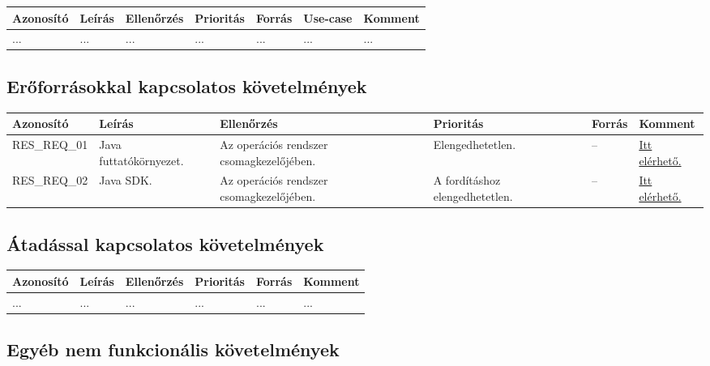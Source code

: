 \begin{longtable}{| l | l | l | l | l | l | l |}
\hline
\textbf{Azonosító}   & \textbf{Leírás} & \textbf{Ellenőrzés} & \textbf{Prioritás} & \textbf{Forrás} & \textbf{Use-case} & \textbf{Komment} \tabularnewline
\hline\hline
... & ... & ... & ... & ... & ... & ... \tabularnewline
\hline
\end{longtable}

\subsection{Erőforrásokkal kapcsolatos követelmények}


\begin{longtable}{| l | l | p{3cm} | p{3cm} | l | l |}
\hline
\textbf{Azonosító}   & \textbf{Leírás} & \textbf{Ellenőrzés} & \textbf{Prioritás} & \textbf{Forrás} & \textbf{Komment} \tabularnewline
\hline\hline
RES\_REQ\_01 & Java futtatókörnyezet. & Az operációs rendszer csomagkezelőjében. & Elengedhetetlen. & -- & \href{https://www.java.com/en/download/}{Itt elérhető.} \tabularnewline
\hline
RES\_REQ\_02 & Java SDK. & Az operációs rendszer csomagkezelőjében. & A fordításhoz elengedhetetlen. & -- & \href{https://www.oracle.com/java/technologies/javase/javase-jdk8-downloads.html}{Itt elérhető.} \tabularnewline
\hline
\end{longtable}


\subsection{Átadással kapcsolatos követelmények}

\begin{longtable}{| l | l | l | l | l | l |}
\hline
\textbf{Azonosító}   & \textbf{Leírás} & \textbf{Ellenőrzés} & \textbf{Prioritás} & \textbf{Forrás} & \textbf{Komment} \tabularnewline
\hline\hline
... & ... & ... & ... & ... & ... \tabularnewline
\hline
\end{longtable}

\subsection{Egyéb nem funkcionális követelmények}

